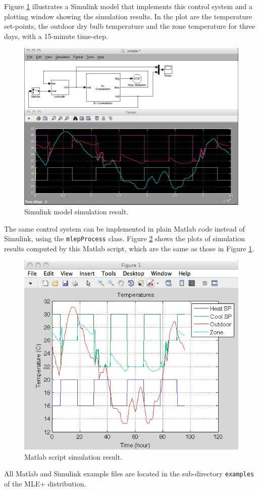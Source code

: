 \documentclass[11pt,letter]{article}
\newcommand{\MLEP}{MLE+\xspace}
\begin{document}
Figure \ref{fig:example-sl} illustrates a Simulink model that
implements this control system and a plotting window showing the
simulation results.  In the plot are the temperature set-points, the
outdoor dry bulb temperature and the zone temperature for three days,
with a 15-minute time-step.
\begin{figure}[tb]
\centering
\includegraphics[width=.8\linewidth]{graphics/simulink.jpg}
\caption{\label{fig:example-sl}Simulink model simulation result.}
\end{figure}

The same control system can be implemented in plain Matlab code
instead of Simulink, using the \verb+mlepProcess+ class.
Figure \ref{fig:example-ml} shows the plots of simulation results
computed by this Matlab script, which are the same as those in Figure
\ref{fig:example-sl}.
\begin{figure}[tb]
\centering
\includegraphics[width=.6\linewidth]{graphics/mlfigure.jpg}
\caption{\label{fig:example-ml}Matlab script simulation result.}
\end{figure}

All Matlab and Simulink example files are located in the sub-directory
\texttt{examples} of the \MLEP distribution.
\end{document}

